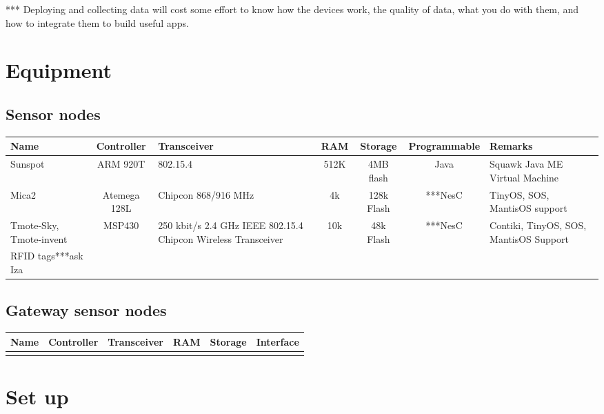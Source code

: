 \documentclass[a4paper, 12pt]{article}
\newcommand{\head}[1]{\textnormal {\textbf{#1}}}
\begin{document}
*** Deploying and collecting data will cost some effort to know how the devices work, the quality of data, what  you do with them, and how to integrate them to build useful apps. \\

 
\section{Equipment}
\subsection{Sensor nodes}
\begin{tabular}{|p{2.5cm}|c|p{2cm}|c|c|c|p{2.5cm}|}
\hline
\head{Name} & \head{Controller} & \head{Transceiver} & \head{RAM} & \head{Storage} &\head{Programmable} &\head{Remarks}\\
\hline
{Sunspot} & {ARM 920T} & {802.15.4} & {512K} & {4MB flash} & {Java } & {Squawk Java ME Virtual Machine} \\
\hline
{Mica2} & {Atemega 128L} & {Chipcon 868/916 MHz}& {4k} & {128k Flash} & {***NesC} & {TinyOS, SOS, MantisOS support} \\
\hline
{Tmote-Sky, Tmote-invent} & {MSP430} & {250 kbit/s 2.4 GHz IEEE 802.15.4 Chipcon Wireless Transceiver} & {10k} & {48k Flash} & {***NesC} & {Contiki, TinyOS, SOS, MantisOS Support}\\
\hline
{RFID tags***ask Iza} &{}&{}&{}&{}&{}&{}\\
\hline
\end{tabular}

\subsection{Gateway sensor nodes}

\begin{tabular}{|p{2.5cm}|c|p{2cm}|c|c|c|}
\hline
\head{Name} & \head{Controller} & \head{Transceiver} & \head{RAM} & \head{Storage} &\head{Interface}\\
\hline
{} &{}&{}&{}&{}&{}\\
\hline
\end{tabular}

\section{Set up}
\end{document}
